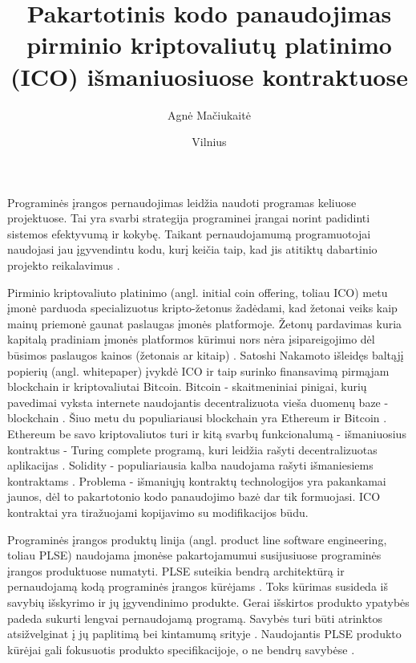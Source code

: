\documentclass{VUMIFPSkursinis}
\title{Pakartotinis kodo panaudojimas pirminio kriptovaliutų platinimo (ICO) išmaniuosiuose kontraktuose}
\author{Agnė Mačiukaitė}
\date{Vilnius \\ \the\year}
\begin{document}
\maketitle

\tableofcontents



Programinės įrangos pernaudojimas leidžia naudoti programas keliuose projektuose. Tai yra svarbi strategija programinei įrangai norint padidinti sistemos efektyvumą ir kokybę. Taikant pernaudojamumą programuotojai naudojasi jau įgyvendintu kodu, kurį keičia taip, kad jis atitiktų dabartinio projekto reikalavimus \cite {Ravichandran2003}.

Pirminio kriptovaliuto platinimo (angl. initial coin offering, toliau ICO) metu įmonė parduoda specializuotus kripto-žetonus žadėdami, kad žetonai veiks kaip mainų priemonė gaunat paslaugas įmonės platformoje. Žetonų pardavimas kuria kapitalą pradiniam įmonės platformos kūrimui nors nėra įsipareigojimo dėl būsimos paslaugos kainos (žetonais ar kitaip) \cite{Catalini2018}. Satoshi Nakamoto išleidęs baltąjį popierių (angl. whitepaper) \cite{Nakamoto2008} įvykdė ICO  ir taip surinko finansavimą pirmąjam blockchain ir kriptovaliutai Bitcoin. Bitcoin - skaitmeniniai pinigai, kurių pavedimai vyksta internete naudojantis decentralizuota vieša duomenų baze - blockchain \cite{Swan2015}. Šiuo metu du populiariausi blockchain yra Ethereum ir Bitcoin \cite{Luu}. Ethereum be savo kriptovaliutos turi ir kitą svarbų funkcionalumą - išmaniuosius kontraktus - Turing complete programą, kuri leidžia rašyti decentralizuotas aplikacijas \cite{Buterin2014}. Solidity - populiariausia kalba naudojama rašyti išmaniesiems kontraktams \cite{Dannen}. Problema - išmaniųjų kontraktų technologijos yra pakankamai jaunos, dėl to pakartotonio kodo panaudojimo bazė dar tik formuojasi. ICO kontraktai yra tiražuojami kopijavimo su modifikacijos būdu.

Programinės įrangos produktų linija (angl. product line software engineering, toliau PLSE) naudojama įmonėse pakartojamumui susijusiuose programinės įrangos produktuose numatyti. PLSE suteikia bendrą architektūrą ir pernaudojamą kodą programinės įrangos kūrėjams \cite{Svahnberg}. Toks kūrimas susideda iš savybių išskyrimo ir jų įgyvendinimo produkte. Gerai išskirtos produkto ypatybės padeda sukurti lengvai pernaudojamą programą. Savybės turi būti atrinktos atsižvelginat į jų paplitimą bei kintamumą srityje \cite{Lee2015}. Naudojantis PLSE produkto kūrėjai gali fokusuotis produkto specifikacijoje, o ne bendrų savybėse \cite{Svahnberg}.
\end{document}
